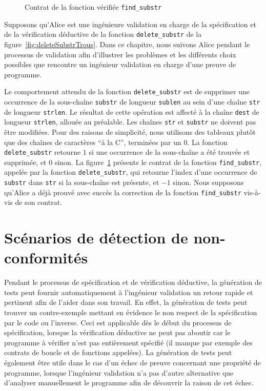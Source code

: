 \begin{figure}[t]
  
  \vspace{-3mm}
  \caption{Contrat \eacsl de la fonction vérifiée \lstinline{find_substr}}
  \vspace{-3mm}
  \label{fig:findSubstr}
\end{figure}

Supposons qu'Alice est une ingénieure validation en charge de la spécification
et de la vérification déductive de la fonction \lstinline{delete_substr} de la
figure~\ref{fig:deleteSubstrTrous}.
Dans ce chapitre, nous suivons Alice pendant le processus de validation afin
d'illustrer les problèmes et les différents choix possibles que rencontre un
ingénieur validation en charge d'une preuve de programme.

Le comportement attendu de la fonction \lstinline{delete_substr} est de
supprimer une occurrence de la sous-chaîne \lstinline{substr} de longueur
\lstinline{sublen} au sein d'une chaîne \lstinline{str} de longueur
\lstinline{strlen}.
Le résultat de cette opération est affecté à la chaîne \lstinline{dest} de
longueur \lstinline'strlen', allouée au préalable.
Les chaînes \lstinline{str} et \lstinline{substr} ne doivent pas être modifiées.
Pour des raisons de simplicité, nous utilisons des tableaux plutôt que des
chaînes de caractères ``à la C'', terminées par un 0.
La fonction \lstinline{delete_substr} retourne $1$ si une occurrence de la
sous-chaîne a été trouvée et supprimée, et $0$ sinon.
La figure~\ref{fig:findSubstr} présente le contrat de la fonction
\lstinline{find_substr}, appelée par la fonction \lstinline{delete_substr}, qui
retourne l'index d'une occurrence de \lstinline{substr} dans \lstinline{str} si
la sous-chaîne est présente, et $-1$ sinon.
Nous supposons qu'Alice a déjà prouvé avec succès la correction de la fonction
\lstinline{find_substr} vis-à-vis de son contrat.


\section{Scénarios de détection de non-conformités}
\label{sec:ncd-scenarios}


Pendant le processus de spécification et de vérification déductive, la
génération de tests peut fournir automatiquement à l'ingénieur validation un
retour rapide et pertinent afin de l'aider dans son travail.
En effet, la génération de tests peut trouver un contre-exemple mettant en
évidence le non respect de la spécification par le code ou l'inverse.
Ceci est applicable dès le début du processus de spécification, lorsque la
vérification déductive ne peut pas aboutir car le programme à vérifier n'est
pas entièrement spécifié (il manque par exemple des contrats de boucle et de
fonctions appelées).
La génération de tests peut également être utile dans le cas d'un échec de
preuve concernant une propriété de programme, lorsque l'ingénieur validation
n'a pas d'autre alternative que d'analyser manuellement le programme afin de
découvrir la raison de cet échec.

